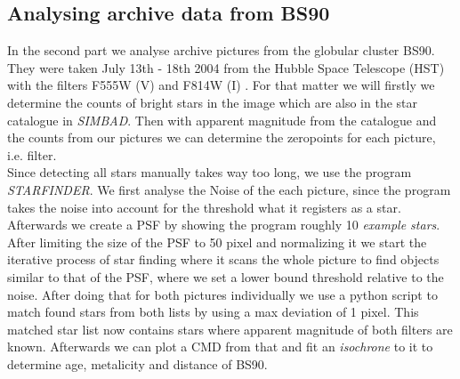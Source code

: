 \subsection{Analysing archive data from BS90}
In the second part we analyse archive pictures from the globular cluster BS90. They were taken July 13th - 18th 2004 from the Hubble Space Telescope (HST) with the filters F555W (V) and F814W (I) \cite{HST_visit_report}. For that matter we will firstly we determine the counts of bright stars in the image which are also in the star catalogue in \textit{SIMBAD}. Then with apparent magnitude from the catalogue and the counts from our pictures we can determine the zeropoints for each picture, i.e. filter.
\vspace{3mm}\\
Since detecting all stars manually takes way too long, we use the program \textit{STARFINDER}. We first analyse the Noise of the each picture, since the program takes the noise into account for the threshold what it registers as a star. Afterwards we create a PSF by showing the program roughly 10 \textit{example stars}. After limiting the size of the PSF to 50 pixel and normalizing it we start the iterative process of star finding where it scans the whole picture to find objects similar to that of the PSF, where we set a lower bound threshold relative to the noise. After doing that for both pictures individually we use a python script to match found stars from both lists by using a max deviation of 1 pixel. This matched star list now contains stars where apparent magnitude of both filters are known. Afterwards we can plot a CMD from that and fit an \textit{isochrone} to it to determine age, metalicity and distance of BS90.
\vspace{3mm}